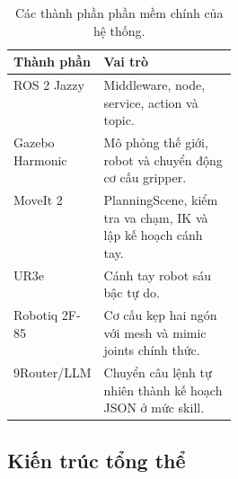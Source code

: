 \documentclass[12pt,a4paper]{article}
\begin{document}
\begin{table}[H]
  \centering
  \caption{Các thành phần phần mềm chính của hệ thống.}
  \label{tab:environment}
  \renewcommand{\arraystretch}{1.25}
  \begin{tabularx}{\linewidth}{@{}p{0.29\linewidth}X@{}}
    \toprule
    \textbf{Thành phần} & \textbf{Vai trò} \\
    \midrule
    ROS 2 Jazzy & Middleware, node, service, action và topic. \\
    Gazebo Harmonic & Mô phỏng thế giới, robot và chuyển động cơ cấu gripper. \\
    MoveIt 2 & PlanningScene, kiểm tra va chạm, IK và lập kế hoạch cánh tay. \\
    UR3e & Cánh tay robot sáu bậc tự do. \\
    Robotiq 2F-85 & Cơ cấu kẹp hai ngón với mesh và mimic joints chính thức. \\
    9Router/LLM & Chuyển câu lệnh tự nhiên thành kế hoạch JSON ở mức skill. \\
    \bottomrule
  \end{tabularx}
\end{table}

\subsection{Kiến trúc tổng thể}
\end{document}
